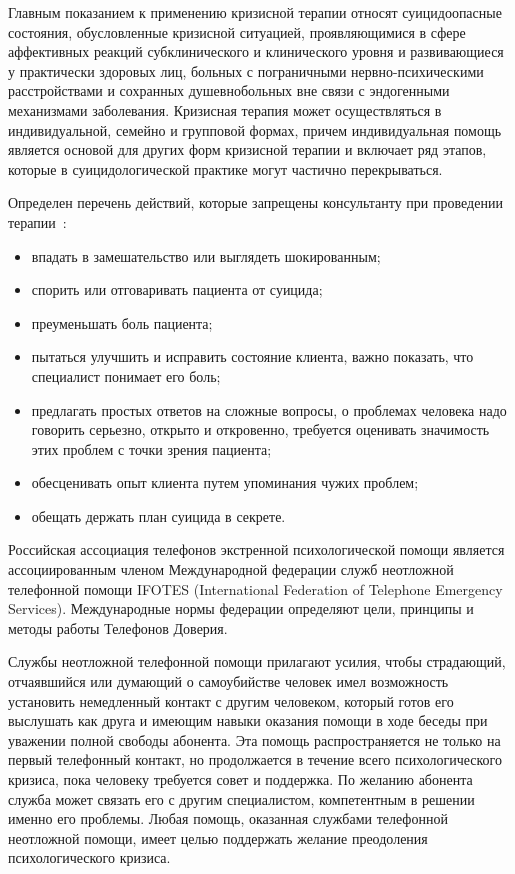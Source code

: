 Главным показанием к применению кризисной терапии относят суицидоопасные состояния, обусловленные кризисной ситуацией, проявляющимися в сфере аффективных реакций субклинического и клинического уровня и развивающиеся у практически здоровых лиц, больных с пограничными нервно-психическими расстройствами и сохранных душевнобольных вне связи с эндогенными механизмами заболевания. Кризисная терапия может осуществляться в индивидуальной, семейно и групповой формах, причем индивидуальная помощь является основой для других форм кризисной терапии и включает ряд этапов, которые в суицидологической практике могут частично перекрываться.~\cite{starsen}

Определен перечень действий, которые запрещены консультанту при проведении терапии~\cite{solov}:
\begin{itemize}
	\item впадать в замешательство или выглядеть шокированным;
	\item спорить или отговаривать пациента от суицида;
	\item преуменьшать боль пациента;
	\item пытаться улучшить и исправить состояние клиента, важно показать, что специалист понимает его боль;
	\item предлагать простых ответов на сложные вопросы, о проблемах человека надо говорить серьезно, открыто и откровенно, требуется оценивать значимость этих проблем с точки зрения пациента;
	\item обесценивать опыт клиента путем упоминания чужих проблем;
	\item обещать держать план суицида в секрете.
\end{itemize}

Российская ассоциация телефонов экстренной психологической помощи является ассоциированным членом Международной федерации служб неотложной телефонной помощи IFOTES (International Federation of Telephone Emergency Services). Международные нормы федерации определяют цели, принципы и методы работы Телефонов Доверия.~\cite{starsen}

Службы неотложной телефонной помощи прилагают усилия, чтобы страдающий, отчаявшийся или думающий о самоубийстве человек имел возможность установить немедленный контакт с другим человеком, который готов его выслушать как друга и имеющим навыки оказания помощи в ходе беседы при уважении полной свободы абонента. Эта помощь распространяется не только на первый телефонный контакт, но продолжается в течение всего психологического кризиса, пока человеку требуется совет и поддержка. По желанию абонента служба может связать его с другим специалистом, компетентным в решении именно его проблемы. Любая помощь, оказанная службами телефонной неотложной помощи, имеет целью поддержать желание преодоления психологического кризиса.~\cite{starsen}

